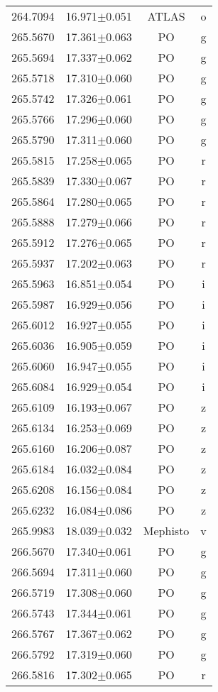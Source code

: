 \begin{table}
\begin{tabular}{cccc}
264.7094 & 16.971$\pm$0.051 & ATLAS & o \\
265.5670 & 17.361$\pm$0.063 & PO & g \\
265.5694 & 17.337$\pm$0.062 & PO & g \\
265.5718 & 17.310$\pm$0.060 & PO & g \\
265.5742 & 17.326$\pm$0.061 & PO & g \\
265.5766 & 17.296$\pm$0.060 & PO & g \\
265.5790 & 17.311$\pm$0.060 & PO & g \\
265.5815 & 17.258$\pm$0.065 & PO & r \\
265.5839 & 17.330$\pm$0.067 & PO & r \\
265.5864 & 17.280$\pm$0.065 & PO & r \\
265.5888 & 17.279$\pm$0.066 & PO & r \\
265.5912 & 17.276$\pm$0.065 & PO & r \\
265.5937 & 17.202$\pm$0.063 & PO & r \\
265.5963 & 16.851$\pm$0.054 & PO & i \\
265.5987 & 16.929$\pm$0.056 & PO & i \\
265.6012 & 16.927$\pm$0.055 & PO & i \\
265.6036 & 16.905$\pm$0.059 & PO & i \\
265.6060 & 16.947$\pm$0.055 & PO & i \\
265.6084 & 16.929$\pm$0.054 & PO & i \\
265.6109 & 16.193$\pm$0.067 & PO & z \\
265.6134 & 16.253$\pm$0.069 & PO & z \\
265.6160 & 16.206$\pm$0.087 & PO & z \\
265.6184 & 16.032$\pm$0.084 & PO & z \\
265.6208 & 16.156$\pm$0.084 & PO & z \\
265.6232 & 16.084$\pm$0.086 & PO & z \\
265.9983 & 18.039$\pm$0.032 & Mephisto & v \\
266.5670 & 17.340$\pm$0.061 & PO & g \\
266.5694 & 17.311$\pm$0.060 & PO & g \\
266.5719 & 17.308$\pm$0.060 & PO & g \\
266.5743 & 17.344$\pm$0.061 & PO & g \\
266.5767 & 17.367$\pm$0.062 & PO & g \\
266.5792 & 17.319$\pm$0.060 & PO & g \\
266.5816 & 17.302$\pm$0.065 & PO & r \\

\end{tabular}
\end{table}
